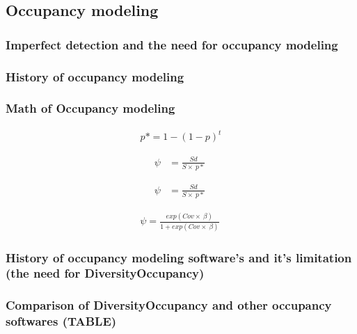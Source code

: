 \documentclass[article]{jss}
\begin{document}
\subsection{Occupancy modeling}\label{occupancy-modeling}

\subsubsection{Imperfect detection and the need for occupancy
modeling}\label{imperfect-detection-and-the-need-for-occupancy-modeling}

\subsubsection{History of occupancy
modeling}\label{history-of-occupancy-modeling}

\subsubsection{Math of Occupancy
modeling}\label{math-of-occupancy-modeling}

\[
\begin{aligned}
  \ p* = 1 -  \left( 1 - p \right)^t \
\end{aligned}
\]

\[
\begin{aligned}
  \psi & = \frac{Sd}{S \times\ p*} \
\end{aligned}
\]

\[
\begin{aligned}
  \psi & = \frac{Sd}{S \times\ p*} \
\end{aligned}
\]

\[
\begin{aligned}
  \psi = \frac{exp(Cov \times\ \beta)}{1 + exp(Cov \times\ \beta)} \
\end{aligned}
\]

\subsubsection{History of occupancy modeling software's and it's
limitation (the need for
DiversityOccupancy)}\label{history-of-occupancy-modeling-softwares-and-its-limitation-the-need-for-diversityoccupancy}

\subsubsection{Comparison of DiversityOccupancy and other occupancy
softwares
(TABLE)}\label{comparison-of-diversityoccupancy-and-other-occupancy-softwares-table}
\end{document}
